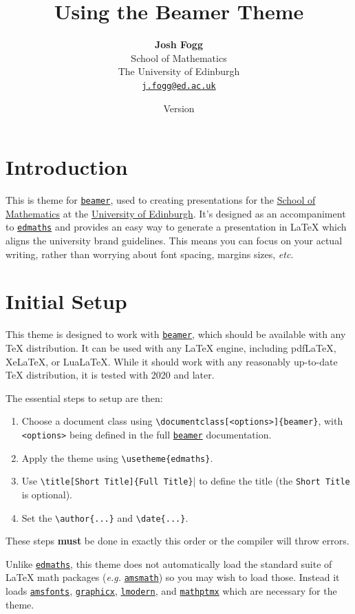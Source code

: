 \documentclass[12pt]{article}
\title{\textbf{Using the \pkg{beamertheme-edmaths} Beamer Theme}}
\author{\textbf{Josh Fogg}\\School of Mathematics\\The University of Edinburgh\\\texttt{\href{mailto:j.fogg@ed.ac.uk}{j.fogg@ed.ac.uk}}}
\date{Version \msuversion\\\msudate}
\newcommand\pkg[1]{\href{https://www.ctan.org/pkg/#1}{\color{teal}\lstinline{#1}}}
\newcommand\key[1]{{\color{orange}\lstinline|#1|}}
\begin{document}
\maketitle
\thispagestyle{empty}

\section{Introduction}

This is theme for \pkg{beamer}, used to creating presentations for the \href{https://www.maths.ed.ac.uk/}{School of Mathematics} at the \href{https://www.ed.ac.uk/}{University of Edinburgh}. It's designed as an accompaniment to \pkg{edmaths} and provides an easy way to generate a presentation in \LaTeX{} which aligns the university brand guidelines. This means you can focus on your actual writing, rather than worrying about font spacing, margins sizes, {\it etc}.

\section{Initial Setup}

This theme is designed to work with \pkg{beamer}, which should be available with any \TeX{} distribution. It can be used with any \LaTeX{} engine, including pdfLaTeX, XeLaTeX, or LuaLaTeX. While it should work with any reasonably up-to-date \TeX{} distribution, it is tested with 2020 and later.

The essential steps to setup are then:
\begin{enumerate}
    \item Choose a document class using \lstinline|\documentclass[<options>]{beamer}|, with \key{<options>} being defined in the full \pkg{beamer} documentation.
    \item Apply the theme using \lstinline|\usetheme{edmaths}|.
    \item Use \lstinline|\title[Short Title]{Full Title}|| to define the title (the \key{Short Title} is optional).
    \item Set the \lstinline|\author{...}| and \lstinline|\date{...}|.
\end{enumerate}
These steps {\bf must} be done in exactly this order or the compiler will throw errors.

Unlike \pkg{edmaths}, this theme does not automatically load the standard suite of \LaTeX{} math packages ({\it e.g.\/} \pkg{amsmath}) so you may wish to load those. Instead it loads \pkg{amsfonts}, \pkg{graphicx}, \pkg{lmodern}, and \pkg{mathptmx} which are necessary for the theme.
\end{document}
